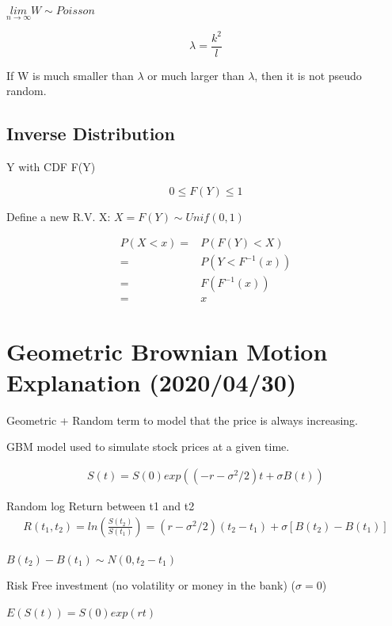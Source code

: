 \documentclass[11pt]{article}
\begin{document}
\(\underset{n \to \infty}{lim} W \sim Poisson\)

$$
\lambda = \frac{k^2}{l}
$$

If W is much smaller than \(\lambda\) or much larger than \(\lambda\), then it is
not pseudo random.

\subsection{Inverse Distribution}
\label{sec:org6698360}

Y with CDF F(Y)

$$
0 \leq F(Y) \leq 1
$$

Define a new R.V. X: \(X = F(Y) \sim Unif(0, 1)\)

\begin{equation}
\begin{split}
P(X < x) = & P(F(Y) < X)\\
= & P(Y < F^{-1} (x))\\
= & F(F^{-1}(x))\\
= & x
\end{split}
\end{equation}
\section{Geometric Brownian Motion Explanation (2020/04/30)}
\label{sec:org6874098}

Geometric + Random term to model that the price is always increasing.

GBM model used to simulate stock prices at a given time.

\begin{equation}
\begin{split}
S(t) = S(0) exp((-r - \sigma^2/2)t + \sigma B(t))
\end{split}
\end{equation}

Random log Return between t1 and t2
\begin{equation}
  \begin{split}
    R(t_1, t_2) = ln(\frac{S(t_2)}{S(t_1)}) = (r - \sigma^2/2)(t_2 - t_1) + \sigma[B(t_2) - B(t_1)]
  \end{split}
\end{equation}

\(B(t_2) - B(t_1) \sim N(0, t_2 - t_1)\)

Risk Free investment (no volatility or money in the bank) (\(\sigma = 0\))

\(E(S(t)) = S(0) exp(rt)\)
\end{document}

